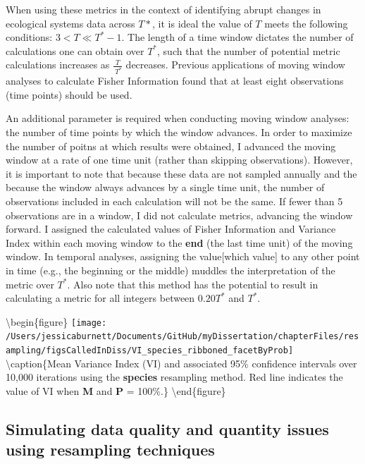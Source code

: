 \documentclass[12pt,twoside,openany]{reedthesis}
\begin{document}
When using these metrics in the context of identifying abrupt changes in ecological systems data across \(T*\), it is ideal the value of \(T\) meets the following conditions: \(3 < T \ll T^*-1\). The length of a time window dictates the number of calculations one can obtain over \(T^*\), such that the number of potential metric calculations increases as \(\frac{T}{\ T^*}\) decreases. Previous applications of moving window analyses to calculate Fisher Information found that at least eight observations (time points) should be used.

An additional parameter is required when conducting moving window analyses: the number of time points by which the window advances. In order to maximize the number of poitns at which results were obtained, I advanced the moving window at a rate of one time unit (rather than skipping observations). However, it is important to note that because these data are not sampled annually and the because the window always advances by a single time unit, the number of observations included in each calculation will not be the same. If fewer than 5 observations are in a window, I did not calculate metrics, advancing the window forward. I assigned the calculated values of Fisher Information and Variance Index within each moving window to the \textbf{end} (the last time unit) of the moving window. In temporal analyses, assigning the value{[}which value{]} to any other point in time (e.g., the beginning or the middle) muddles the interpretation of the metric over \(T^*\). Also note that this method has the potential to result in calculating a metric for all integers between \(0.20 T^*\) and \(T^*\).

\textbackslash begin\{figure\}
\texttt{[image: /Users/jessicaburnett/Documents/GitHub/myDissertation/chapterFiles/resampling/figsCalledInDiss/VI\_species\_ribboned\_facetByProb]} \textbackslash caption\{Mean Variance Index (VI) and associated 95\% confidence intervals over 10,000 iterations using the \textbf{species} resampling method. Red line indicates the value of VI when \textbf{M} and \textbf{P} = 100\%.\}\label{fig:viResamp2}
\textbackslash end\{figure\}

\hypertarget{simulating-data-quality-and-quantity-issues-using-resampling-techniques}{%
\subsection{Simulating data quality and quantity issues using resampling techniques}\label{simulating-data-quality-and-quantity-issues-using-resampling-techniques}}
\end{document}
